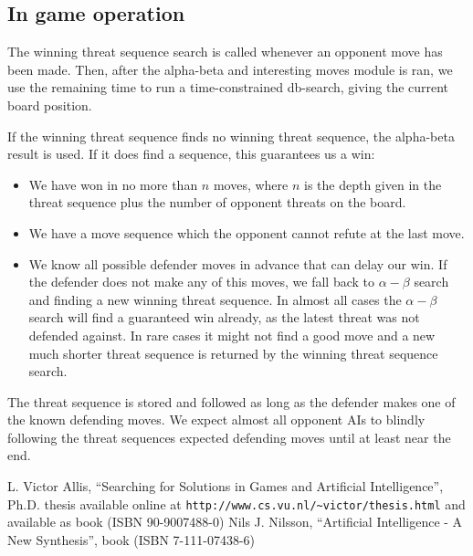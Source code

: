 \documentclass[10pt]{article}
\begin{document}
\subsection{In game operation}

The winning threat sequence search is called whenever an opponent move has
been made.  Then, after the alpha-beta and interesting moves module is ran, we
use the remaining time to run a time-constrained db-search, giving the current
board position.

If the winning threat sequence finds no winning threat sequence, the
alpha-beta result is used.  If it does find a sequence, this guarantees us a
win:

\begin{itemize}
\item We have won in no more than $n$ moves, where $n$ is the depth given in
the threat sequence plus the number of opponent threats on the board.
\item We have a move sequence which the opponent cannot refute at the last
move.
\item We know all possible defender moves in advance that can delay our win.
If the defender does not make any of this moves, we fall back to
$\alpha-\beta$ search and finding a new winning threat sequence.  In almost
all cases the $\alpha-\beta$ search will find a guaranteed win already, as the
latest threat was not defended against.  In rare cases it might not find a
good move and a new much shorter threat sequence is returned by the winning
threat sequence search.
\end{itemize}

The threat sequence is stored and followed as long as the defender makes one
of the known defending moves.  We expect almost all opponent AIs to blindly
following the threat sequences expected defending moves until at least near
the end.

\begin{thebibliography}{99}
 L. Victor Allis, ``Searching for Solutions in Games and
Artificial Intelligence'', Ph.D. thesis available online at
\verb|http://www.cs.vu.nl/~victor/thesis.html| and available as book (ISBN
90-9007488-0)
 Nils J. Nilsson, ``Artificial Intelligence - A New
Synthesis'', book (ISBN 7-111-07438-6)
\end{thebibliography}
\end{document}
